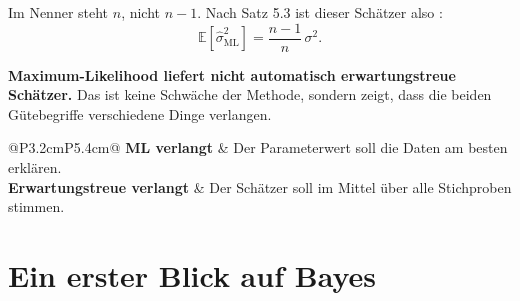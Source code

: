 \begin{warnung}
Im Nenner steht $n$, nicht $n-1$. Nach Satz 5.3 ist dieser Schätzer also :
\[ \mathbb{E}[\hat\sigma^2_{\mathrm{ML}}] = \frac{n-1}{n}\,\sigma^2 . \]

\begin{center}
\begin{minipage}{0.9\textwidth}
\textbf{Maximum-Likelihood liefert nicht automatisch erwartungstreue Schätzer.} Das ist keine Schwäche der Methode, sondern zeigt, dass die beiden Gütebegriffe verschiedene Dinge verlangen.
\end{minipage}
\end{center}

\begin{center}
\renewcommand{\arraystretch}{1.5}
\begin{tabular}{@{}P{3.2cm}P{5.4cm}@{}}
\toprule
\textbf{ML verlangt} & Der Parameterwert soll die Daten am besten erklären.\\
\textbf{Erwartungs\-treue verlangt} & Der Schätzer soll im Mittel über alle Stichproben stimmen.\\
\bottomrule
\end{tabular}
\end{center}

\begin{center}
\begin{minipage}{0.88\textwidth}
\end{minipage}
\end{center}
\end{warnung}

\section{Ein erster Blick auf Bayes}

